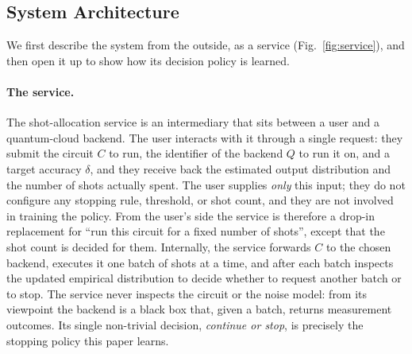 \documentclass[runningheads]{llncs}
\begin{document}
\subsection{System Architecture}

We first describe the system from the outside, as a service (Fig.~\ref{fig:service}),
and then open it up to show how its decision policy is learned.

\paragraph{The service.} The shot-allocation service is an intermediary that sits
between a user and a quantum-cloud backend. The user interacts with it through a
single request: they submit the circuit $C$ to run, the identifier of the
backend $Q$ to run it on, and a target accuracy $\delta$, and they receive back
the estimated output distribution and the number of shots actually spent. The
user supplies \emph{only} this input; they do not configure any stopping rule,
threshold, or shot count, and they are not involved in training the policy. From
the user's side the service is therefore a drop-in replacement for ``run this
circuit for a fixed number of shots'', except that the shot count is decided for
them. Internally, the service forwards $C$ to the chosen backend, executes it one
batch of shots at a time, and after each batch inspects the updated empirical
distribution to decide whether to request another batch or to stop. The service
never inspects the circuit or the noise model: from its viewpoint the backend is
a black box that, given a batch, returns measurement outcomes. Its single
non-trivial decision, \emph{continue or stop}, is precisely the stopping policy
this paper learns.
\end{document}
